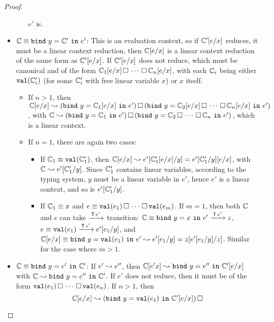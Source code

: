 \documentclass[10pt,a4]{article}
\begin{document}
\begin{proof}
\begin{itemize}
\begin{itemize}
    $e'$ is.
  \end{itemize}
\item $\mathbb{C} \equiv \mathtt{bind} \ {y} = {\mathbb{C}'} \ \mathtt{in} \ {e'}$:
  This is an evaluation context, so if $\mathbb{C}'[e/x]$ reduces, it must be a linear context reduction, 
  then $\mathbb{C}[e/x]$ is a linear context reduction of the same form as $\mathbb{C}'[e/x]$.
  If $\mathbb{C}'[e/x]$ does not reduce, which must be canonical and of the form 
  $\mathbb{C}_1[e/x] \,\square\, \cdots \,\square\, \mathbb{C}_n[e/x]$, with each $\mathbb{C}_i$ being either 
  $\mathtt{val}(\mathbb{C}_i')$ (for some $\mathbb{C}_i'$ with free linear variable $x$) or $x$ itself. 
  \begin{itemize}
  \item If $n > 1$, then 
    $\mathbb{C}[e/x] \leadsto (\mathtt{bind} \ {y} = {\mathbb{C}_1[e/x]} \ \mathtt{in} \ {e'}) \,\square\, 
    (\mathtt{bind} \ {y} = {\mathbb{C}_2[e/x] \,\square\, \cdots \,\square\, \mathbb{C}_n[e/x]} \ \mathtt{in} \ {e'})$,
    with $\mathbb{C} \leadsto (\mathtt{bind} \ {y} = {\mathbb{C}_1} \ \mathtt{in} \ {e'}) \,\square\, 
    (\mathtt{bind} \ {y} = {\mathbb{C}_2 \,\square\, \cdots \,\square\, \mathbb{C}_n} \ \mathtt{in} \ {e'})$, which is a linear context.
  \item If $n =1$, there are again two cases: 
    \begin{itemize}
    \item If $\mathbb{C}_1 \equiv \mathtt{val}(\mathbb{C}_1')$, 
      then $\mathbb{C}[e/x] \leadsto e'[\mathbb{C}_1'[e/x]/y] = e'[\mathbb{C}_1'/y][e/x]$, with 
      $\mathbb{C} \leadsto e'[\mathbb{C}_1'/y]$. Since $\mathbb{C}_1'$ contains linear variables, according to the typing system, 
      $y$ must be a linear variable in $e'$, hence $e'$ is a linear context, and so is $e'[\mathbb{C}_1'/y]$.
    \item If $\mathbb{C}_1 \equiv x$ and $e \equiv \mathtt{val}(e_1) \,\square\, \cdots \,\square\, \mathtt{val}(e_m)$. If $m=1$, then both 
      $\mathbb{C}$  and $e$ can take $\xrightarrow{\,{\mathsf{T} \, e'}\,}$ transition: 
      $\mathbb{C} \equiv \mathtt{bind} \ {y} = {x} \ \mathtt{in} \ {e'} \xrightarrow{\,{\mathsf{T} \, e'}\,} z$, $e \equiv \mathtt{val}(e_1) \xrightarrow{\,{\mathsf{T} \, e'}\,} e'[e_1/y]$, 
      and $\mathbb{C}[e/x] \equiv \mathtt{bind} \ {y} = {\mathtt{val}(e_1)} \ \mathtt{in} \ {e'} \leadsto e'[e_1/y] = z[e'[e_1/y]/z]$.
      Similar for the case where $m > 1$.
    \end{itemize}
  \end{itemize}
\item $\mathbb{C} \equiv \mathtt{bind} \ {y} = {e'} \ \mathtt{in} \ {\mathbb{C}'}$:
  If $e' \leadsto e''$, then $\mathbb{C}[e'x] \leadsto \mathtt{bind} \ {y} = {e''} \ \mathtt{in} \ {\mathbb{C}'[e/x]}$ with
  $\mathbb{C} \leadsto \mathtt{bind} \ {y} = {e''} \ \mathtt{in} \ {\mathbb{C}'}$.
  If $e'$ does not reduce, then it must be of the form $\mathtt{val}(e_1) \,\square\, \cdots \,\square\, \mathtt{val}(e_n)$. 
  If $n > 1$, then 
  \[
  \mathbb{C}[e/x] \leadsto (\mathtt{bind} \ {y} = {\mathtt{val}(e_1)} \ \mathtt{in} \ {\mathbb{C}'[e/x]}) \,\square\, 
\]
\end{itemize}
\end{proof}
\end{document}
